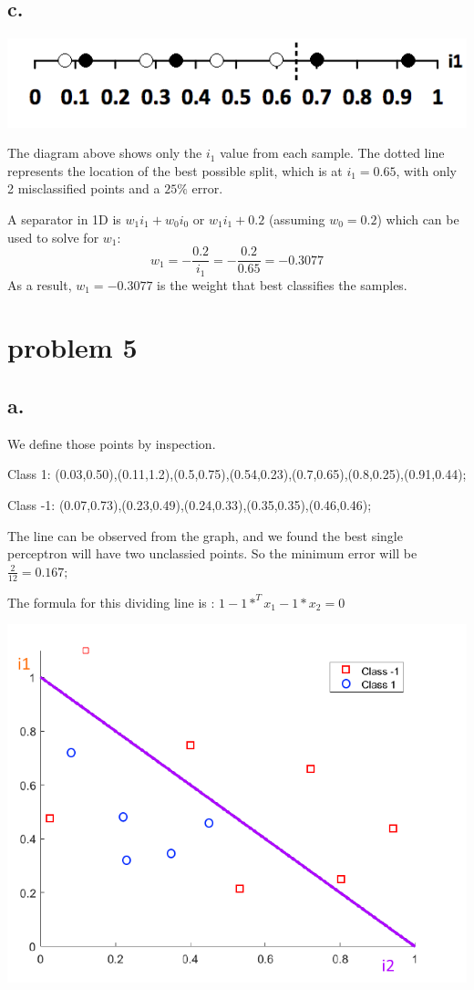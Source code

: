 \documentclass[12pt, letterpaper]{article}
\begin{document}
	\medskip 
	
	
	\subsection{c.}
	\includegraphics[scale=1]{"Problem 4/1D Diagram"}	
	
	The diagram above shows only the $i_1$ value from each sample. The dotted line represents the location of the best possible split, which is at $i_1 = 0.65$, with only 2 misclassified points and a $25\%$ error. 
	
	A separator in 1D is $w_1i_1 + w_0i_0$ or $w_1i_1 + 0.2$ (assuming $w_0 = 0.2$) which can be used to solve for $w_1$:
	$$w_1 = -\frac{0.2}{i_1} = -\frac{0.2}{0.65} = -0.3077$$ 
	As a result, $w_1 = -0.3077$ is the weight that best classifies the samples.
	
	\pagebreak
	\section{problem 5}
	\subsection{a.}
	
	We define those points by inspection.
	
	Class 1: (0.03,0.50),(0.11,1.2),(0.5,0.75),(0.54,0.23),(0.7,0.65),(0.8,0.25),(0.91,0.44);
	
	Class -1: (0.07,0.73),(0.23,0.49),(0.24,0.33),(0.35,0.35),(0.46,0.46);
	
	The line can be observed from the graph, and we found the best single perceptron will have two unclassied points. So the minimum error will be
	$\frac{2}{12}= 0.167; $
	
	The formula for this dividing line is : $1-1*^{T}x_{1}-1*x_{2}=0$
	
	\includegraphics[scale=0.6]{"problem-5a"}
	
\end{document}
